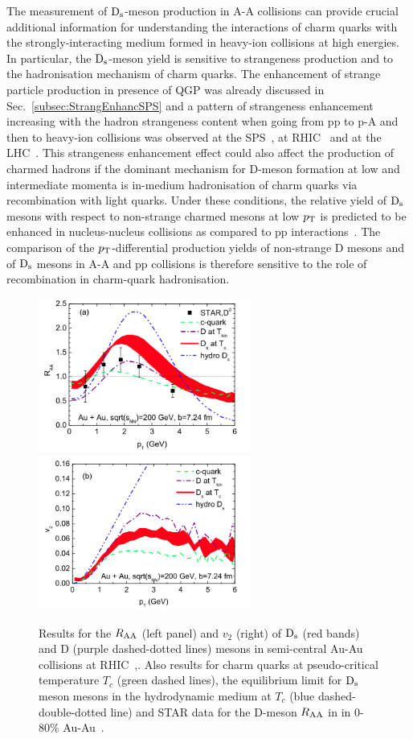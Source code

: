 The measurement of ${\rm D_s}$-meson production in A-A collisions can provide 
crucial additional information for understanding the 
interactions of charm quarks with the strongly-interacting 
medium formed in heavy-ion collisions at high energies.
In particular, the ${\rm D_s}$-meson yield is sensitive to strangeness production 
and to the hadronisation mechanism of charm quarks.
The enhancement of strange particle production in presence of QGP was already discussed in
Sec.~\ref{subsec:StrangEnhancSPS} and a pattern of strangeness 
enhancement increasing with the hadron strangeness 
content when going from pp to p-A and then to heavy-ion collisions was observed at 
the SPS~\cite{NA57_158,NA57_40,NA49_Kpi,NA49_LambdaXi}, at
RHIC~\cite{STAR_hyperons} and at the LHC~\cite{ALICE:2017jyt}.
This strangeness enhancement effect could also affect the production of 
charmed hadrons if the dominant mechanism for D-meson formation at 
low and intermediate momenta is in-medium hadronisation of charm quarks via 
recombination with light quarks.
Under these conditions, the relative yield 
of ${\rm D_s}$ mesons with respect to non-strange charmed mesons at low $p_{\rm T}$ is predicted to be enhanced
in nucleus-nucleus collisions as compared to pp 
interactions~\cite{Andronic2003,RafelskiKuznetsova,HeFriesRapp}.
The comparison of the $p_{\rm T}$-differential production yields 
of non-strange D mesons and of ${\rm D_s}$ mesons in A-A and pp 
collisions is therefore sensitive to the role of recombination in charm-quark 
hadronisation.
\begin{figure}[!h]
  \centering
  \includegraphics[width=7cm]{FigCap2/RaaDsRapp.png}
  \includegraphics[width=7cm]{FigCap2/v2DsRapp.png}
  \caption{Results for the $R_{\rm AA}$ (left panel) and $v_2$ (right) of ${\rm D_s}$ (red bands) and D (purple dashed-dotted lines) mesons in semi-central Au-Au collisions at RHIC~\cite{He:2012df},. Also results for charm quarks at pseudo-critical temperature $T_c$ (green dashed lines), the equilibrium limit for ${\rm D_s}$ meson mesons in the hydrodynamic medium at $T_{c}$ (blue dashed-double-dotted line) and STAR data for the D-meson $R_{\rm AA}$ in in 0-80\% Au-Au~\cite{Zhang:2011uva}.}
  \label{fig:Rapp}
\end{figure}
